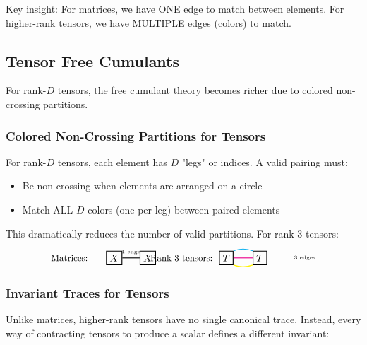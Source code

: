 Key insight: For matrices, we have ONE edge to match between elements. For higher-rank tensors, we have MULTIPLE edges (colors) to match.

\subsection{Tensor Free Cumulants}

For rank-$D$ tensors, the free cumulant theory becomes richer due to colored non-crossing partitions.

\subsubsection{Colored Non-Crossing Partitions for Tensors}

For rank-$D$ tensors, each element has $D$ "legs" or indices. A valid pairing must:
\begin{itemize}
\item Be non-crossing when elements are arranged on a circle
\item Match ALL $D$ colors (one per leg) between paired elements
\end{itemize}

This dramatically reduces the number of valid partitions. For rank-3 tensors:
\[
\begin{tikzpicture}[baseline=-.5em, scale=0.8]
   \node at (-3,0) {\small Matrices:};
   \node[draw, thick] (M1) at (-1,0) {$X$};
   \node[draw, thick] (M2) at (0.5,0) {$X$};
   \draw[thick] (M1.east) -- (M2.west) node[midway, above] {\tiny 1 edge};
   
   \node at (2,0) {\small Rank-3 tensors:};
   \node[draw, thick] (T1) at (4,0) {$T$};
   \node[draw, thick] (T2) at (5.5,0) {$T$};
   \draw[cyan, thick] (T1.north east) to[bend left=20] (T2.north west);
   \draw[magenta, thick] (T1.east) -- (T2.west);
   \draw[yellow, thick] (T1.south east) to[bend right=20] (T2.south west);
   \node at (7.5,0) {\tiny 3 edges};
\end{tikzpicture}
\]

\subsubsection{Invariant Traces for Tensors}

Unlike matrices, higher-rank tensors have no single canonical trace. Instead, every way of contracting tensors to produce a scalar defines a different invariant:

